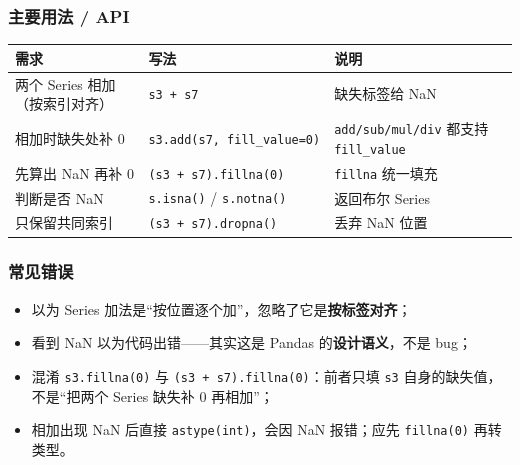 \subsubsection{主要用法 / API}\label{ux4e3bux8981ux7528ux6cd5-api-17}

{\def\LTcaptype{none} %
\begin{longtable}[]{@{}
  >{\raggedright\arraybackslash}p{}
  >{\raggedright\arraybackslash}p{}
  >{\raggedright\arraybackslash}p{}@{}}
\toprule\noalign{}
\begin{minipage}[b]{\linewidth}\raggedright
需求
\end{minipage} & \begin{minipage}[b]{\linewidth}\raggedright
写法
\end{minipage} & \begin{minipage}[b]{\linewidth}\raggedright
说明
\end{minipage} \\
\midrule\noalign{}
\endhead
\bottomrule\noalign{}
\endlastfoot
两个 Series 相加（按索引对齐） & \texttt{s3\ +\ s7} & 缺失标签给 NaN \\
相加时缺失处补 0 & \texttt{s3.add(s7,\ fill\_value=0)} &
\texttt{add/sub/mul/div} 都支持 \texttt{fill\_value} \\
先算出 NaN 再补 0 & \texttt{(s3\ +\ s7).fillna(0)} & \texttt{fillna}
统一填充 \\
判断是否 NaN & \texttt{s.isna()} / \texttt{s.notna()} & 返回布尔
Series \\
只保留共同索引 & \texttt{(s3\ +\ s7).dropna()} & 丢弃 NaN 位置 \\
\end{longtable}
}

\subsubsection{常见错误}\label{ux5e38ux89c1ux9519ux8bef-17}

\begin{itemize}
\tightlist
\item
  以为 Series 加法是``按位置逐个加''，忽略了它是\textbf{按标签对齐}；
\item
  看到 NaN 以为代码出错------其实这是 Pandas 的\textbf{设计语义}，不是
  bug；
\item
  混淆 \texttt{s3.fillna(0)} 与 \texttt{(s3\ +\ s7).fillna(0)}：前者只填
  \texttt{s3} 自身的缺失值，不是``把两个 Series 缺失补 0 再相加''；
\item
  相加出现 NaN 后直接 \texttt{astype(int)}，会因 NaN 报错；应先
  \texttt{fillna(0)} 再转类型。
\end{itemize}

